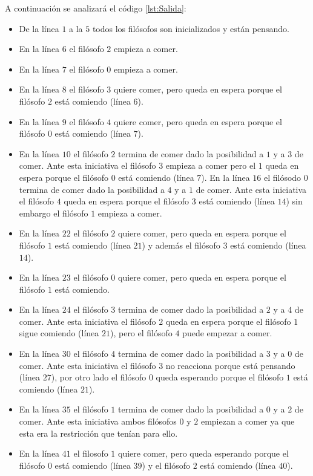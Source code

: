 A continuación se analizará el código \ref{lst:Salida}:
\begin{itemize}
    \item De la línea $1$ a la $5$ todos los filósofos son inicializados y están pensando.
    \item En la línea $6$ el filósofo $2$ empieza a comer.
    \item En la línea $7$ el filósofo $0$ empieza a comer.
    \item En la línea $8$ el filósofo $3$ quiere comer, pero queda en espera porque el filósofo $2$ está comiendo (línea $6$).
    \item En la línea $9$ el filósofo $4$ quiere comer, pero queda en espera porque el filósofo $0$ está comiendo (línea $7$).
    \item En la línea $10$ el filósofo $2$ termina de comer dado la posibilidad a $1$ y a $3$ de comer.
    Ante esta iniciativa el filósofo $3$ empieza a comer pero el $1$ queda en espera porque el filósofo $0$ está comiendo (línea $7$).
    En la línea $16$ el filósodo $0$ termina de comer dado la posibilidad a $4$ y a $1$ de comer.
    Ante esta iniciativa el filósofo $4$ queda en espera porque el filósofo $3$ está comiendo (línea $14$) sin embargo el filósofo $1$ empieza a comer.
    \item En la línea $22$ el filósofo $2$ quiere comer, pero queda en espera porque el filósofo $1$ está comiendo (línea $21$) y además el filósofo $3$ está comiendo (línea $14$).
    \item En la línea $23$ el filósofo $0$ quiere comer, pero queda en espera porque el filósofo $1$ está comiendo.
    \item En la línea $24$ el filósofo $3$ termina de comer dado la posibilidad a $2$ y a $4$ de comer.
    Ante esta iniciativa el filósofo $2$ queda en espera porque el filósofo $1$ sigue comiendo (línea $21$), pero el filósofo $4$ puede empezar a comer.
    \item En la línea $30$ el filósofo $4$ termina de comer dado la posibilidad a $3$ y a $0$ de comer.
    Ante esta iniciativa el filósofo $3$ no reacciona porque está pensando (línea $27$), por otro lado el filósofo $0$ queda esperando porque el filósofo $1$ está comiendo (línea $21$).
    \item En la línea $35$ el filósofo $1$ termina de comer dado la posibilidad a $0$ y a $2$ de comer.
    Ante esta iniciativa ambos filósofos $0$ y $2$ empiezan a comer ya que esta era la restricción que tenían para ello.
    \item En la línea $41$ el filosofo $1$ quiere comer, pero queda esperando porque el filósofo $0$ está comiendo (línea $39$) y el filósofo $2$ está comiendo (línea $40$).

\end{itemize}
